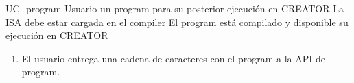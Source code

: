\begin{useCase}{UC-}
    { \gls{program}} %
    {Usuario} %
    { un \gls{program} para su posterior ejecución en CREATOR} %
    {La \gls{ISA} debe estar cargada en el \gls{compiler}} %
    {El \gls{program} está compilado y disponible su ejecución en CREATOR} %
    \begin{enumerate}[leftmargin=*, topsep=0pt, noitemsep]
        \item El usuario entrega una cadena de caracteres con el \gls{program}
        a la \gls{API} de  \gls{program}.
    \end{enumerate}
\end{useCase}
